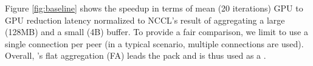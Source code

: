 Figure \ref{fig:baseline} shows the speedup in terms of mean (20 iterations) GPU to GPU reduction latency normalized to NCCL's result of aggregating a large (128MB) and a small (4B) buffer. To provide a fair comparison, we limit \ha to use a single connection per peer (in a typical scenario, multiple connections are used). Overall, \ha{}'s flat aggregation (FA) leads the pack and is thus used as a \strongbaseline.





